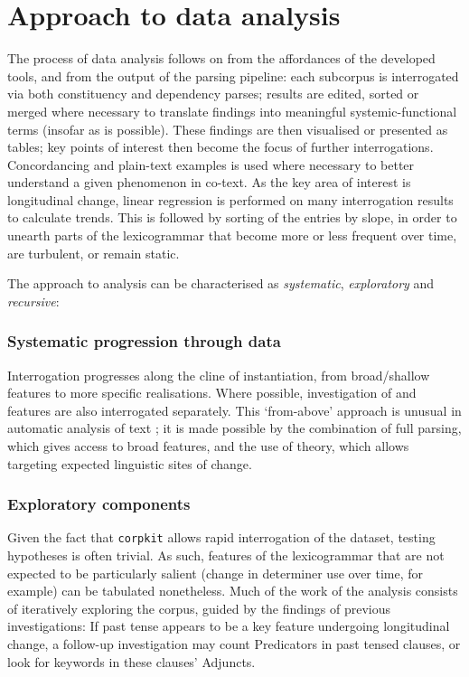 \section{Approach to data analysis}

The process of data analysis follows on from the affordances of the developed tools, and from the output of the parsing pipeline: each subcorpus is interrogated via both constituency and dependency parses; results are edited, sorted or merged where necessary to translate findings into meaningful systemic\hyp{}functional terms (insofar as is possible). These findings are then visualised or presented as tables; key points of interest then become the focus of further interrogations. Concordancing and plain-text examples is used where necessary to better understand a given  phenomenon in co\hyp{}text. As the key area of interest is longitudinal change, linear regression is performed on many interrogation results to calculate trends. This is followed by sorting of the entries by slope, in order to unearth parts of the lexicogrammar that become more or less frequent over time, are turbulent, or remain static.

The approach to analysis can be characterised as \emph{systematic}, \emph{exploratory} and \emph{recursive}:

\subsubsection*{Systematic progression through data}

Interrogation progresses along the cline of instantiation, from broad\slash shallow features to more specific  realisations. Where possible, investigation of  and  features are also interrogated separately. This `from\hyp{}above' approach is unusual in automatic analysis of text \cite{matthiessen_key_2010}; it is made possible by the combination of full parsing, which gives access to broad features, and the use of theory, which allows targeting expected linguistic sites of change.

\subsubsection*{Exploratory components}

Given the fact that \texttt{corpkit} allows rapid interrogation of the dataset, testing hypotheses is often trivial. As such, features of the \gls{lexicogrammar} that are not expected to be particularly salient (change in determiner use over time, for example) can be tabulated nonetheless. Much of the work of the analysis consists of iteratively exploring the \gls{corpus}, guided by the findings of previous investigations: If past tense appears to be a key feature undergoing longitudinal change, a follow\hyp{}up investigation may count Predicators in past tensed clauses, or look for keywords in these clauses' Adjuncts.

